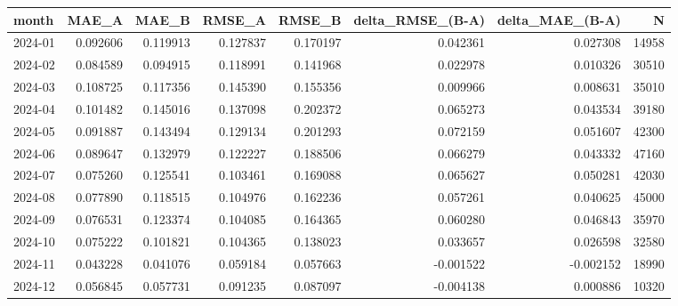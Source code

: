 \begin{tabular}{lrrrrrrr}
\toprule
month & MAE_A & MAE_B & RMSE_A & RMSE_B & delta_RMSE_(B-A) & delta_MAE_(B-A) & N \\
\midrule
2024-01 & 0.092606 & 0.119913 & 0.127837 & 0.170197 & 0.042361 & 0.027308 & 14958 \\
2024-02 & 0.084589 & 0.094915 & 0.118991 & 0.141968 & 0.022978 & 0.010326 & 30510 \\
2024-03 & 0.108725 & 0.117356 & 0.145390 & 0.155356 & 0.009966 & 0.008631 & 35010 \\
2024-04 & 0.101482 & 0.145016 & 0.137098 & 0.202372 & 0.065273 & 0.043534 & 39180 \\
2024-05 & 0.091887 & 0.143494 & 0.129134 & 0.201293 & 0.072159 & 0.051607 & 42300 \\
2024-06 & 0.089647 & 0.132979 & 0.122227 & 0.188506 & 0.066279 & 0.043332 & 47160 \\
2024-07 & 0.075260 & 0.125541 & 0.103461 & 0.169088 & 0.065627 & 0.050281 & 42030 \\
2024-08 & 0.077890 & 0.118515 & 0.104976 & 0.162236 & 0.057261 & 0.040625 & 45000 \\
2024-09 & 0.076531 & 0.123374 & 0.104085 & 0.164365 & 0.060280 & 0.046843 & 35970 \\
2024-10 & 0.075222 & 0.101821 & 0.104365 & 0.138023 & 0.033657 & 0.026598 & 32580 \\
2024-11 & 0.043228 & 0.041076 & 0.059184 & 0.057663 & -0.001522 & -0.002152 & 18990 \\
2024-12 & 0.056845 & 0.057731 & 0.091235 & 0.087097 & -0.004138 & 0.000886 & 10320 \\
\bottomrule
\end{tabular}
